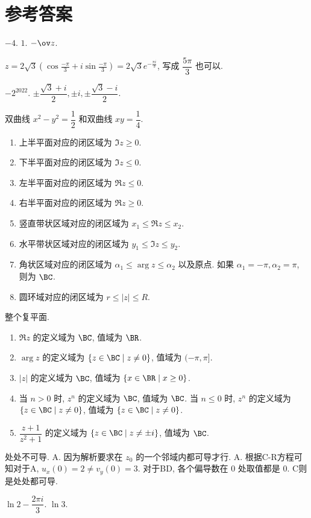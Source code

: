 \chapter*{参考答案}

 $-4$.
 $1$.
 $-\ov z$.

 $\displaystyle z=2\sqrt3\left(\cos\frac{-\pi}3+i\sin\frac{-\pi}3\right)=2\sqrt3e^{-\frac{\pi i}3}$, 写成 $\dfrac{5\pi}3$ 也可以.

 $-2^{2022}$.
 $\pm\dfrac{\sqrt3+i}2,\pm i,\pm\dfrac{\sqrt3-i}2$.

 双曲线 $x^2-y^2=\dfrac12$ 和双曲线 $xy=\dfrac14$.
\begin{enumerate}
	\item 上半平面对应的闭区域为 $\Im z\ge0$.
	\item 下半平面对应的闭区域为 $\Im z\le0$.
	\item 左半平面对应的闭区域为 $\Re z\le0$.
	\item 右半平面对应的闭区域为 $\Re z\ge0$.
	\item 竖直带状区域对应的闭区域为 $x_1\le\Re z\le x_2$.
	\item 水平带状区域对应的闭区域为 $y_1\le\Im z\le y_2$.
	\item 角状区域对应的闭区域为 $\alpha_1\le \arg z\le \alpha_2$ 以及原点. 如果 $\alpha_1=-\pi,\alpha_2=\pi$, 则为 $\BC$.
	\item 圆环域对应的闭区域为 $r\le|z|\le R$.
\end{enumerate}
 整个复平面.

\begin{enumerate}
	\item $\Re z$ 的定义域为 $\BC$, 值域为 $\BR$.
	\item $\arg z$ 的定义域为 $\{z\in\BC\mid z\neq 0\}$, 值域为 $(-\pi,\pi]$.
	\item $|z|$ 的定义域为 $\BC$, 值域为 $\{x\in\BR\mid x\ge0\}$.
	\item 当 $n>0$ 时, $z^n$ 的定义域为 $\BC$, 值域为 $\BC$.
	当 $n\le 0$ 时, $z^n$ 的定义域为 $\{z\in\BC\mid z\neq 0\}$, 值域为 $\{z\in\BC\mid z\neq 0\}$.
	\item $\dfrac{z+1}{z^2+1}$ 的定义域为 $\{z\in\BC\mid z\neq \pm i\}$, 值域为 $\BC$.
\end{enumerate}


 处处不可导.
 A. 因为解析要求在 $z_0$ 的一个邻域内都可导才行.
 A. 根据C-R方程可知对于A, $u_x(0)=2\neq v_y(0)=3$. 对于BD, 各个偏导数在 $0$ 处取值都是 $0$. C则是处处都可导.

 $\ln 2-\dfrac{2\pi i}3$.
 $\ln 3$.

